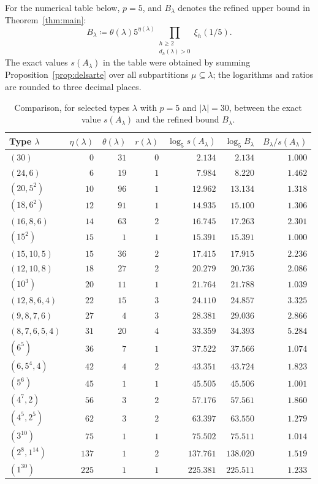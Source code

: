 \documentclass[a4paper,11pt,reqno]{amsart}
\theoremstyle{plain}
\theoremstyle{remark}
\numberwithin{equation}{section}
\renewcommand{\geq}{\geqslant}
\begin{document}
For the numerical table below, $p=5$, and $B_\lambda$ denotes the refined upper
bound in Theorem~\ref{thm:main}:
\[
        B_\lambda\coloneqq
        \theta(\lambda)5^{\eta(\lambda)}
        \prod_{\substack{h\geq 2\\ d_h(\lambda)>0}}\xi_h(1/5).
\]
The exact values $s(A_\lambda)$ in the table were obtained by summing
Proposition~\ref{prop:delsarte} over all subpartitions $\mu\subseteq\lambda$;
the logarithms and ratios are rounded to three decimal places.

\begin{table}[htbp]
\centering
\begin{tabular}{@{}lrrrrrr@{}}
\toprule
Type $\lambda$ & $\eta(\lambda)$ & $\theta(\lambda)$ & $r(\lambda)$
& $\log_5 s(A_\lambda)$ & $\log_5 B_\lambda$ & $B_\lambda/s(A_\lambda)$ \\
\midrule
$(30)$ & $0$ & $31$ & $0$ & $2.134$ & $2.134$ & $1.000$ \\
$(24,6)$ & $6$ & $19$ & $1$ & $7.984$ & $8.220$ & $1.462$ \\
$(20,5^2)$ & $10$ & $96$ & $1$ & $12.962$ & $13.134$ & $1.318$ \\
$(18,6^2)$ & $12$ & $91$ & $1$ & $14.935$ & $15.100$ & $1.306$ \\
$(16,8,6)$ & $14$ & $63$ & $2$ & $16.745$ & $17.263$ & $2.301$ \\
$(15^2)$ & $15$ & $1$ & $1$ & $15.391$ & $15.391$ & $1.000$ \\
$(15,10,5)$ & $15$ & $36$ & $2$ & $17.415$ & $17.915$ & $2.236$ \\
$(12,10,8)$ & $18$ & $27$ & $2$ & $20.279$ & $20.736$ & $2.086$ \\
$(10^3)$ & $20$ & $11$ & $1$ & $21.764$ & $21.788$ & $1.039$ \\
$(12,8,6,4)$ & $22$ & $15$ & $3$ & $24.110$ & $24.857$ & $3.325$ \\
$(9,8,7,6)$ & $27$ & $4$ & $3$ & $28.381$ & $29.036$ & $2.866$ \\
$(8,7,6,5,4)$ & $31$ & $20$ & $4$ & $33.359$ & $34.393$ & $5.284$ \\
$(6^5)$ & $36$ & $7$ & $1$ & $37.522$ & $37.566$ & $1.074$ \\
$(6,5^4,4)$ & $42$ & $4$ & $2$ & $43.351$ & $43.724$ & $1.823$ \\
$(5^6)$ & $45$ & $1$ & $1$ & $45.505$ & $45.506$ & $1.001$ \\
$(4^7,2)$ & $56$ & $3$ & $2$ & $57.176$ & $57.561$ & $1.860$ \\
$(4^5,2^5)$ & $62$ & $3$ & $2$ & $63.397$ & $63.550$ & $1.279$ \\
$(3^{10})$ & $75$ & $1$ & $1$ & $75.502$ & $75.511$ & $1.014$ \\
$(2^8,1^{14})$ & $137$ & $1$ & $2$ & $137.761$ & $138.020$ & $1.519$ \\
$(1^{30})$ & $225$ & $1$ & $1$ & $225.381$ & $225.511$ & $1.233$ \\
\bottomrule
\end{tabular}
\vspace{0.3em}
\caption{Comparison, for selected types $\lambda$ with $p=5$ and
$|\lambda|=30$, between the exact value $s(A_\lambda)$ and the refined bound
$B_\lambda$.}
\label{tab:comparison-30}
\end{table}
\end{document}
